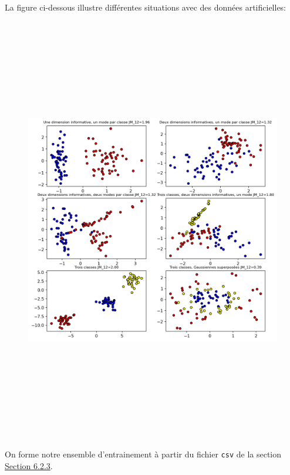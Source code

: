 \documentclass[
]{article}
\begin{document}
La figure ci-dessous illustre différentes situations avec des données
artificielles:

\label{1c13f01b}
\begin{figure}
\centering
\includegraphics[width=8.21875in,height=7.39583in]{05-ClassificationsSupervisees_files/figure-html/cell-14-output-1.png}
\caption{}
\end{figure}

On forme notre ensemble d'entrainement à partir du fichier \texttt{csv}
de la section \hyperref[sec-05.02.02]{{Section 6.2.3}}.
\end{document}

